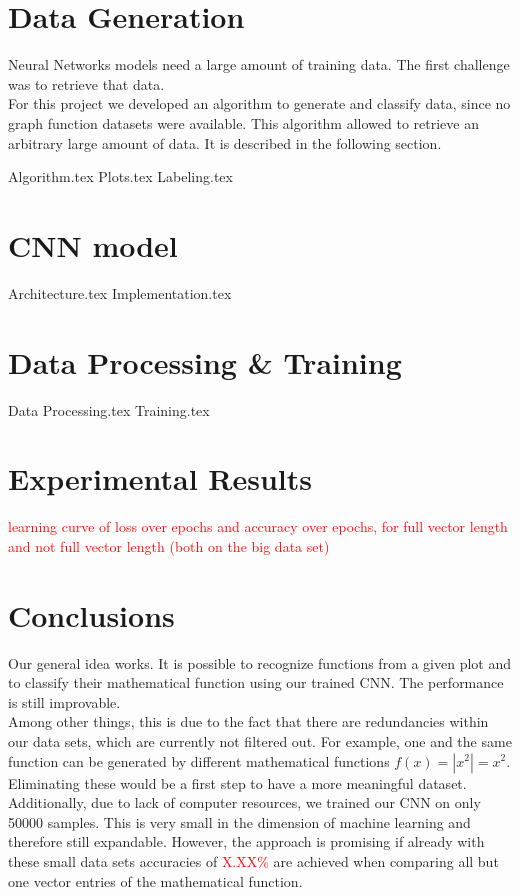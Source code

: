 \documentclass[11pt,a4paper]{scrartcl}
\begin{document}
	\section{Data Generation}
	Neural Networks models need a large amount of training data. The first challenge was to retrieve that data.\\
	For this project we developed an algorithm to generate and classify data, since no graph function datasets were available. This algorithm allowed to retrieve an arbitrary large amount of data. It is described in the following section.
	
	{Algorithm.tex}
	{Plots.tex}
	{Labeling.tex}


	\section{CNN model}
	{Architecture.tex}
	{Implementation.tex}
	
	\section{Data Processing \& Training}
	{Data Processing.tex}
	{Training.tex}

	\section{Experimental Results}
	\textcolor{red}{learning curve of loss over epochs and accuracy over epochs, for full vector length and not full vector length (both on the big data set)}

	\section{Conclusions}
	Our general idea works. It is possible to recognize functions from a given plot and to classify their mathematical function using our trained CNN. The performance is still improvable.\\
	Among other things, this is due to the fact that there are redundancies within our data sets, which are currently not filtered out. For example, one and the same function can be generated by different mathematical functions \(f(x) = |x^2| = x^2\). Eliminating these would be a first step to have a more meaningful dataset.\\
	Additionally, due to lack of computer resources, we trained our CNN on only 50000 samples. This is very small in the dimension of machine learning and therefore still expandable. However, the approach is promising if already with these small data sets accuracies of \textcolor{red}{X.XX\%} are achieved when comparing all but one vector entries of the mathematical function. 
\end{document}

